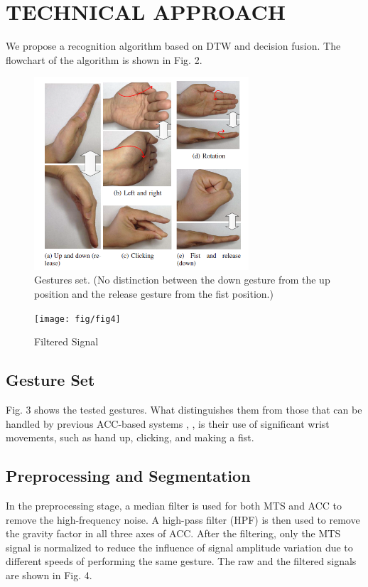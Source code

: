 \section{TECHNICAL APPROACH}
We propose a recognition algorithm based on DTW and
decision fusion. The flowchart of the algorithm is shown in
Fig. 2.

\begin{figure}[t]
\centering
\includegraphics[width=8cm]{fig/fig3}
\caption{Gestures set. (No distinction between the down gesture
from the up position and the release gesture from the fist
position.)}
\end{figure}

\begin{figure}[t]
\centering
\texttt{[image: fig/fig4]}
\caption{Filtered Signal}
\end{figure}

\subsection{Gesture Set}
Fig. 3 shows the tested gestures. What distinguishes them
from those that can be handled by previous ACC-based systems
\cite{c4}, \cite{c13}, \cite{c14} is their use of significant wrist movements,
such as hand up, clicking, and making a fist.

\subsection{Preprocessing and Segmentation}
In the preprocessing stage, a median filter is used for
both MTS and ACC to remove the high-frequency noise. A
high-pass filter (HPF) is then used to remove the gravity
factor in all three axes of ACC. After the filtering, only the
MTS signal is normalized to reduce the influence of signal
amplitude variation due to different speeds of performing the
same gesture. The raw and the filtered signals are shown in
Fig. 4.

